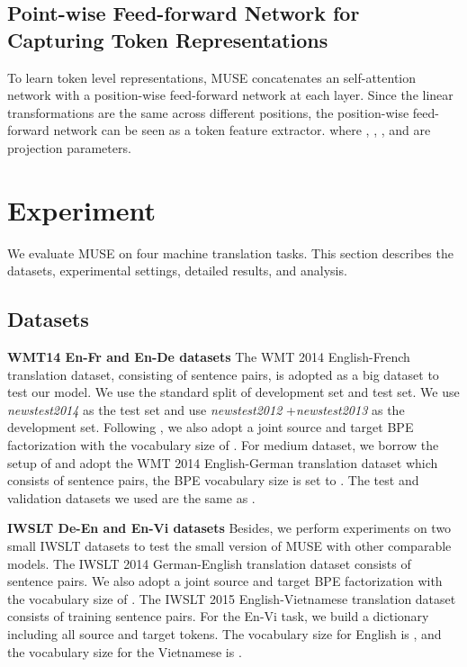 \documentclass{article} \usepackage{iclr2020_conference,times}
\begin{document}
\subsection{Point-wise Feed-forward Network for Capturing Token Representations} To learn  token level representations, MUSE concatenates an self-attention network  with a position-wise feed-forward network at each layer.  Since the linear transformations are the same across different positions, the position-wise feed-forward network can be seen as a token feature extractor. 
where , , , and  are projection parameters.

















\section{Experiment}
We evaluate MUSE on four machine translation tasks. This section describes the datasets, experimental settings, detailed results, and analysis. \subsection{Datasets}
\textbf{WMT14 En-Fr and En-De datasets} The WMT 2014 English-French translation dataset, consisting of   sentence pairs, is adopted as a big dataset to test our model. We use the standard split of development set and test set. We use \textit{newstest2014} as the test set and use \textit{newstest2012} +\textit{newstest2013} as the development set. Following \citet{gehring2017convolutional}, we also adopt a joint source and target BPE factorization with the vocabulary size of .
For medium dataset, we borrow the setup of \citet{vaswani2017attention} and adopt the WMT 2014 English-German translation dataset which consists of  sentence pairs, the BPE vocabulary size is set to . The test and validation  datasets we used are the same as \citet{vaswani2017attention}.

\textbf{IWSLT De-En and En-Vi datasets} Besides, we perform experiments on two small IWSLT datasets to test the small version of MUSE with other comparable models. The IWSLT 2014 German-English translation dataset consists of  sentence pairs. We also adopt a joint source and target BPE factorization with the vocabulary size of . The IWSLT 2015 English-Vietnamese translation dataset consists of  training sentence pairs. For the En-Vi task, we build a dictionary including all source and target tokens. The vocabulary size for English is , and the vocabulary size for the Vietnamese is . 
\end{document}
